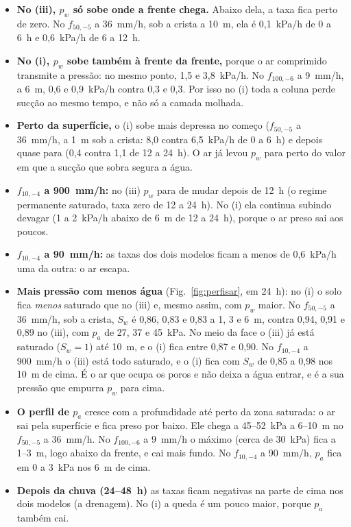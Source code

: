 \documentclass[11pt,a4paper]{article}
\begin{document}
\begin{itemize}
  \item \textbf{No (iii), $p_w$ só sobe onde a frente chega.} Abaixo dela, a taxa fica perto de zero. No $f_{50,-5}$ a
    36~mm/h, sob a crista a 10~m, ela é 0,1~kPa/h de 0 a 6~h e 0,6~kPa/h de 6 a 12~h.
  \item \textbf{No (i), $p_w$ sobe também à frente da frente,} porque o ar comprimido transmite a pressão: no mesmo
    ponto, 1,5 e 3,8~kPa/h. No $f_{100,-6}$ a 9~mm/h, a 6~m, 0,6 e 0,9~kPa/h contra 0,3 e 0,3. Por isso no (i) toda a
    coluna perde sucção ao mesmo tempo, e não só a camada molhada.
  \item \textbf{Perto da superfície,} o (i) sobe mais depressa no começo ($f_{50,-5}$ a 36~mm/h, a 1~m sob a crista:
    8,0 contra 6,5~kPa/h de 0 a 6~h) e depois quase para (0,4 contra 1,1 de 12 a 24~h). O ar já levou $p_w$ para
    perto do valor em que a sucção que sobra segura a água.
  \item \textbf{$f_{10,-4}$ a 900~mm/h:} no (iii) $p_w$ para de mudar depois de 12~h (o regime permanente saturado,
    taxa zero de 12 a 24~h). No (i) ela continua subindo devagar (1 a 2~kPa/h abaixo de 6~m de 12 a 24~h), porque o
    ar preso sai aos poucos.
  \item \textbf{$f_{10,-4}$ a 90~mm/h:} as taxas dos dois modelos ficam a menos de 0,6~kPa/h uma da outra: o ar escapa.
  \item \textbf{Mais pressão com menos água} (Fig.~\ref{fig:perfisar}, em 24~h): no (i) o solo fica \emph{menos}
    saturado que no (iii) e, mesmo assim, com $p_w$ maior. No $f_{50,-5}$ a 36~mm/h, sob a crista, $S_w$ é 0,86, 0,83
    e 0,83 a 1, 3 e 6~m, contra 0,94, 0,91 e 0,89 no (iii), com $p_a$ de 27, 37 e 45~kPa. No meio da face o (iii) já
    está saturado ($S_w = 1$) até 10~m, e o (i) fica entre 0,87 e 0,90. No $f_{10,-4}$ a 900~mm/h o (iii) está todo
    saturado, e o (i) fica com $S_w$ de 0,85 a 0,98 nos 10~m de cima. É o ar que ocupa os poros e não deixa a água
    entrar, e é a sua pressão que empurra $p_w$ para cima.
  \item \textbf{O perfil de $p_a$} cresce com a profundidade até perto da zona saturada: o ar sai pela superfície e
    fica preso por baixo. Ele chega a 45--52~kPa a 6--10~m no $f_{50,-5}$ a 36~mm/h. No $f_{100,-6}$ a 9~mm/h o máximo
    (cerca de 30~kPa) fica a 1--3~m, logo abaixo da frente, e cai mais fundo. No $f_{10,-4}$ a 90~mm/h, $p_a$ fica em
    0 a 3~kPa nos 6~m de cima.
  \item \textbf{Depois da chuva (24--48~h)} as taxas ficam negativas na parte de cima nos dois modelos (a drenagem). No
    (i) a queda é um pouco maior, porque $p_a$ também cai.
\end{itemize}
\end{document}
